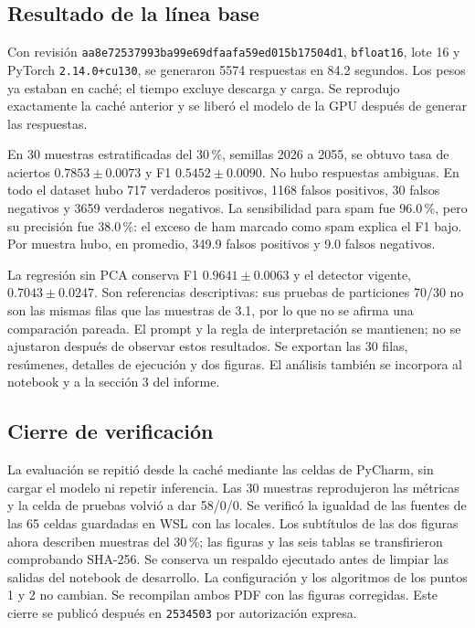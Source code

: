 \documentclass[11pt,letterpaper]{article}
\renewcommand{\_}{\originalunderscore\allowbreak}
\begin{document}
\subsection{Resultado de la línea base}
Con revisión \texttt{aa8e72537993ba99e69dfaafa59ed015b17504d1},
\texttt{bfloat16}, lote 16 y PyTorch \texttt{2.14.0+cu130}, se generaron
5574 respuestas en 84.2 segundos. Los pesos ya estaban en caché; el tiempo
excluye descarga y carga. Se reprodujo exactamente la caché anterior y se
liberó el modelo de la GPU después de generar las respuestas.

En 30 muestras estratificadas del 30\,\%, semillas 2026 a 2055, se obtuvo
tasa de aciertos $0.7853\pm0.0073$ y F1 $0.5452\pm0.0090$. No hubo respuestas
ambiguas. En todo el dataset hubo 717 verdaderos positivos, 1168 falsos
positivos, 30 falsos negativos y 3659 verdaderos negativos. La sensibilidad
para spam fue 96.0\,\%, pero su precisión fue 38.0\,\%: el exceso de ham
marcado como spam explica el F1 bajo. Por muestra hubo, en promedio, 349.9
falsos positivos y 9.0 falsos negativos.

La regresión sin PCA conserva F1 $0.9641\pm0.0063$ y el detector vigente,
$0.7043\pm0.0247$. Son referencias descriptivas: sus pruebas de particiones
70/30 no son las mismas filas que las muestras de 3.1, por lo que no se
afirma una comparación pareada. El prompt y la regla de interpretación se
mantienen; no se ajustaron después de observar estos resultados. Se exportan
las 30 filas, resúmenes, detalles de ejecución y dos figuras. El análisis
también se incorpora al notebook y a la sección 3 del informe.

\subsection{Cierre de verificación}
La evaluación se repitió desde la caché mediante las celdas de PyCharm,
sin cargar el modelo ni repetir inferencia. Las 30 muestras reprodujeron
las métricas y la celda de pruebas volvió a dar 58/0/0. Se verificó la
igualdad de las fuentes de las 65 celdas guardadas en WSL con las locales.
Los subtítulos de las dos figuras ahora describen muestras del 30\,\%;
las figuras y las seis tablas se transfirieron comprobando SHA-256.
Se conserva un respaldo ejecutado antes de limpiar las salidas del notebook
de desarrollo. La configuración y los algoritmos de los puntos 1 y 2 no
cambian. Se recompilan ambos PDF con las figuras corregidas. Este cierre
se publicó después en \texttt{2534503} por autorización expresa.
\end{document}
